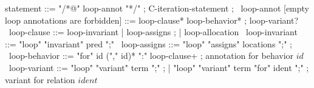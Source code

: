 \begin{syntax}
  statement ::= "/*@" loop-annot "*/" ;
  C-iteration-statement ;
  \
  loop-annot [empty loop annotations are forbidden] ::= loop-clause* loop-behavior* ;
                 loop-variant?
  \
  loop-clause ::= loop-invariant | loop-assigns ;
                | loop-allocation
  \
  loop-invariant ::= "loop" "invariant" pred ";" 
  \
  loop-assigns ::= "loop" "assigns" locations ";" ;
  \
  loop-behavior ::= "for" id ("," id)* ":" loop-clause+ ; annotation for behavior $id$
  \
  loop-variant ::= "loop" "variant" term ";" ;
  | "loop" "variant" term "for" ident ";" ; variant for relation $ident$
\end{syntax}
